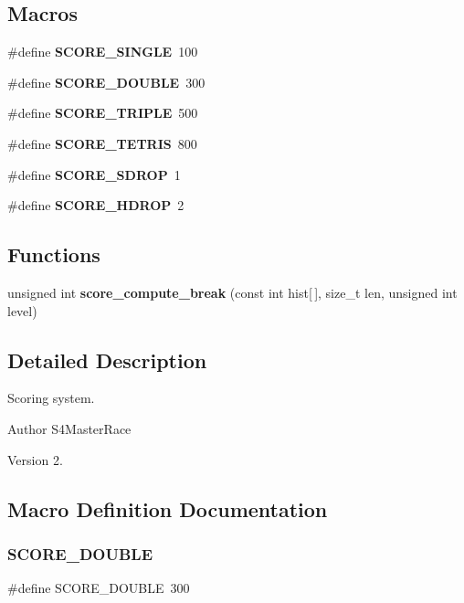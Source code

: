 \subsection*{Macros}
\begin{DoxyCompactItemize}
\item 
\#define \textbf{ S\+C\+O\+R\+E\+\_\+\+S\+I\+N\+G\+LE}~100
\item 
\#define \textbf{ S\+C\+O\+R\+E\+\_\+\+D\+O\+U\+B\+LE}~300
\item 
\#define \textbf{ S\+C\+O\+R\+E\+\_\+\+T\+R\+I\+P\+LE}~500
\item 
\#define \textbf{ S\+C\+O\+R\+E\+\_\+\+T\+E\+T\+R\+IS}~800
\item 
\#define \textbf{ S\+C\+O\+R\+E\+\_\+\+S\+D\+R\+OP}~1
\item 
\#define \textbf{ S\+C\+O\+R\+E\+\_\+\+H\+D\+R\+OP}~2
\end{DoxyCompactItemize}
\subsection*{Functions}
\begin{DoxyCompactItemize}
\item 
unsigned int \textbf{ score\+\_\+compute\+\_\+break} (const int hist[$\,$], size\+\_\+t len, unsigned int level)
\end{DoxyCompactItemize}


\subsection{Detailed Description}
Scoring system. 

\begin{DoxyAuthor}{Author}
S4\+Master\+Race 
\end{DoxyAuthor}
\begin{DoxyVersion}{Version}
2. 
\end{DoxyVersion}


\subsection{Macro Definition Documentation}
\mbox{\label{score_8h_abf3a94c8c811229ec8c21ba8097f4a8f}} 
\subsubsection{S\+C\+O\+R\+E\+\_\+\+D\+O\+U\+B\+LE}
{\footnotesize\ttfamily \#define S\+C\+O\+R\+E\+\_\+\+D\+O\+U\+B\+LE~300}


